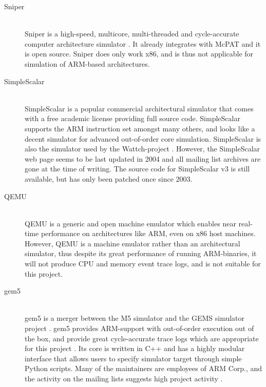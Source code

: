 \begin{description}
\item[Sniper] \hfill\\
    Sniper is a high-speed, multicore, multi-threaded and cycle-accurate
    computer architecture simulator \cite{sniperwebpage,carlson2013ssomta}. It
    already integrates with McPAT and it is open source. Sniper does only work
    x86, and is thus not applicable for simulation of ARM-based architectures.

\item[SimpleScalar] \hfill\\
    SimpleScalar is a popular commercial architectural simulator that comes with
    a free academic license providing full source code. SimpleScalar supports
    the ARM instruction set amongst many others, and looks like a decent
    simulator for advanced out-of-order core simulation. SimpleScalar is also
    the simulator used by the Wattch-project \cite{brooks2000wattch}. However,
    the SimpleScalar web page seems to be last updated in 2004 and all mailing
    list archives are gone at the time of writing. The source code for
    SimpleScalar v3 is still available, but has only been patched once since
    2003.

\item[QEMU]\hfill\\
    QEMU is a generic and open machine emulator which enables near real-time
    performance on architectures like ARM, even on x86 host machines. However,
    QEMU is a machine emulator rather than an architectural simulator, thus
    despite its great performance of running ARM-binaries, it will not produce
    CPU and memory event trace logs, and is not suitable for this project.

\item[gem5]\hfill\\
    gem5 is a merger between the M5 simulator \cite{binkert2006m5} and the GEMS
    simulator project \cite{GEMS}. gem5 provides ARM-support with out-of-order
    execution out of the box, and provide great cycle-accurate trace logs which
    are appropriate for this project \cite{gem5simulator}. Its core is written
    in C++ and has a highly modular interface that allows users to specify
    simulator target through simple Python scripts. Many of the maintainers are
    employees of ARM Corp., and the activity on the mailing lists suggests high
    project activity \cite{gem5dev}.
\end{description}

